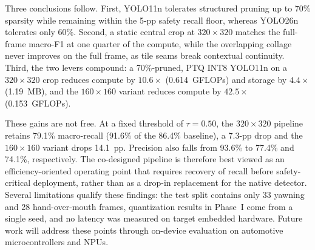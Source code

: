 \documentclass[conference]{IEEEtran}
\begin{document}
Three conclusions follow. First, YOLO11n tolerates structured pruning up to 70\% sparsity while remaining within the 5-pp safety recall floor, whereas YOLO26n tolerates only 60\%.  Second, a static central crop at $320\times320$ matches the full-frame macro-F1 at one quarter of the compute, while the overlapping collage never improves on the full frame, as tile seams break contextual continuity. Third, the two levers compound: a 70\%-pruned, PTQ INT8 YOLO11n on a $320\times320$ crop reduces compute by $10.6\times$ (0.614~GFLOPs) and storage by $4.4\times$ (1.19~MB), and the $160\times160$ variant reduces compute by $42.5\times$ (0.153~GFLOPs).

These gains are not free. At a fixed threshold of $\tau=0.50$, the $320\times320$ pipeline retains 79.1\% macro-recall (91.6\% of the 86.4\% baseline), a 7.3-pp drop and the $160\times160$ variant drops 14.1~pp. Precision also falls from 93.6\% to 77.4\% and 74.1\%, respectively. The co-designed pipeline is therefore best viewed as an efficiency-oriented operating point that requires recovery of recall before safety-critical deployment, rather than as a drop-in replacement for the native detector. Several limitations qualify these findings: the test split contains only 33 yawning and 28 hand-over-mouth frames, quantization results in Phase~I come from a single seed, and no latency was measured on target embedded hardware. Future work will address these points through on-device evaluation on automotive microcontrollers and NPUs.
\end{document}

